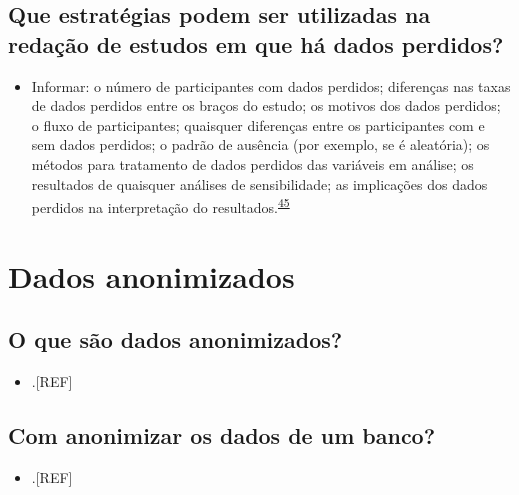 \documentclass[
  a4paper,
]{book}
\providecommand{\tightlist}{%
  \setlength{\itemsep}{0pt}\setlength{\parskip}{0pt}}
\begin{document}
\hypertarget{que-estratuxe9gias-podem-ser-utilizadas-na-redauxe7uxe3o-de-estudos-em-que-huxe1-dados-perdidos}{%
\subsection{Que estratégias podem ser utilizadas na redação de estudos em que há dados perdidos?}\label{que-estratuxe9gias-podem-ser-utilizadas-na-redauxe7uxe3o-de-estudos-em-que-huxe1-dados-perdidos}}

\begin{itemize}
\tightlist
\item
  Informar: o número de participantes com dados perdidos; diferenças nas taxas de dados perdidos entre os braços do estudo; os motivos dos dados perdidos; o fluxo de participantes; quaisquer diferenças entre os participantes com e sem dados perdidos; o padrão de ausência (por exemplo, se é aleatória); os métodos para tratamento de dados perdidos das variáveis em análise; os resultados de quaisquer análises de sensibilidade; as implicações dos dados perdidos na interpretação do resultados.\textsuperscript{\protect\hyperlink{ref-Akl2015}{45}}
\end{itemize}

\hypertarget{dados-anonimizados}{%
\section{Dados anonimizados}\label{dados-anonimizados}}

\hypertarget{o-que-suxe3o-dados-anonimizados}{%
\subsection{O que são dados anonimizados?}\label{o-que-suxe3o-dados-anonimizados}}

\begin{itemize}
\tightlist
\item
  .{[}REF{]}
\end{itemize}

\hypertarget{com-anonimizar-os-dados-de-um-banco}{%
\subsection{Com anonimizar os dados de um banco?}\label{com-anonimizar-os-dados-de-um-banco}}

\begin{itemize}
\tightlist
\item
  .{[}REF{]}
\end{itemize}
\end{document}
